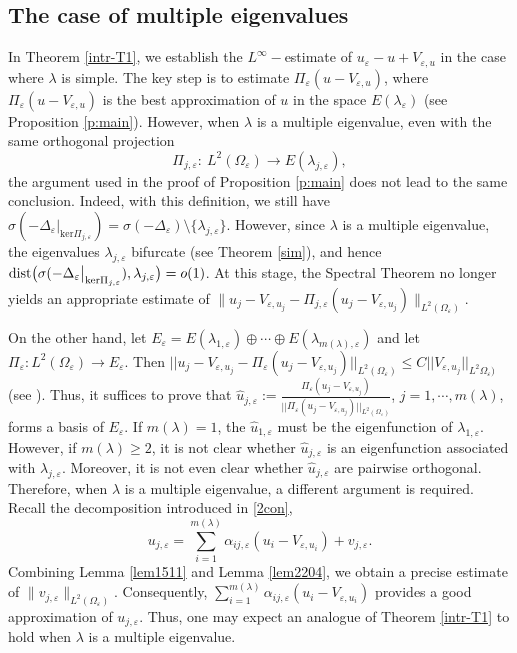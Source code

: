 \documentclass[11pt,reqno]{article}
\numberwithin{equation}{section}
\newcommand\e\varepsilon
\newcommand\la\lambda
\renewcommand\O\Omega
\begin{document}
	
\subsection{The case of multiple eigenvalues}

	 In Theorem \ref{intr-T1}, we establish the $L^\infty-$estimate of $u_\e-u+V_{\e,u}$ in the case where $\lambda$ is simple. The key  step is to estimate $\Pi_\e (u-V_{\e,u})$, where  $\Pi_\e (u-V_{\e,u})$ is the best approximation of $u$ in the space $E(\lambda_\e)$ (see Proposition \ref{p:main}). However, when $\lambda$ is a multiple eigenvalue, even with the same  orthogonal projection 
\[
	\Pi_{j,\e}: \ L^2(\Omega_\e) \to E(\lambda_{j,\e}),
	\] 
    the argument used in the proof of Proposition \ref{p:main} does not lead to the same conclusion. 
   Indeed, with this definition, we still have
    $\sigma(-\Delta_\e\big|_{\mathrm{ker}\Pi_{j,\e}})=\sigma(-\Delta_\e)\setminus
    \{\lambda_{j,\e}\}$. However, since $\lambda$ is  a multiple eigenvalue, the eigenvalues $\lambda_{j,\e}$  bifurcate   (see Theorem \ref{sim}), and hence $\hbox{dist}\big(\sigma(-\Delta_\e\big|_{\mathrm{ker}\Pi_{j,\e}}),\lambda_{j,\e}\big)=o(1)$. At this stage, the Spectral Theorem no longer yields an appropriate estimate of $\|u_j-V_{\e,u_j}-\Pi_{j,\e}(u_j-V_{\e,u_j})\|_{L^2(\Omega_\e)}$. 

    On the other hand, let $E_\e=E(\lambda_{1,\e})\oplus\cdots\oplus E(\lambda_{m(\lambda),\e})$ and let $\Pi_\e: L^2(\O_\e)\to E_\e$. Then  $||u_j-V_{\e,u_j}-\Pi_\e(u_j-V_{\e,u_j})||_{L^2(\O_\e)}\leq C||V_{\e,u_j}||_{L^2{\O_\e)}}$ (see  \cite[Lemma 4]{alm2026}). Thus, it  suffices to prove that $\hat{u}_{j,\e}:=\frac{\Pi_\e(u_j-V_{\e,u_j})}{||\Pi_\e(u_j-V_{\e,u_j})||_{L^2(\O_\e)}}$, $j=1,\cdots,m(\lambda)$,  forms a basis of $E_\e$. If $m(\lambda)=1$, the $\hat{u}_{1,\e}$ must be the eigenfunction of $\lambda_{1,\e}$. However, if $m(\lambda)\ge 2$, it is not clear whether $\hat{u}_{j,\e}$ is an eigenfunction associated with $\lambda_{j,\e}$. Moreover, it is  not even clear whether $\hat{u}_{j,\e}$ are pairwise orthogonal. Therefore,  when $\lambda$ is a multiple eigenvalue, a different argument is required.
    Recall the decomposition introduced in \eqref{2con},
$$u_{j,\e}=\sum_{i=1}^{m(\la)}\alpha_{ij,\e} (u_i-V_{\e,u_i})+ v_{j,\e}.$$
Combining  Lemma \ref{lem1511} and  Lemma \ref{lem2204}, we obtain a precise  estimate of $\|v_{j,\e}\|_{L^2(\O_\e)}$. Consequently, $\sum_{i=1}^{m(\la)}\alpha_{ij,\e} (u_i-V_{\e,u_i})$ provides a good approximation of   $u_{j,\e}$. Thus, one may expect an analogue of Theorem \ref{intr-T1} to hold when $\lambda$ is a multiple eigenvalue.
 
\end{document}
